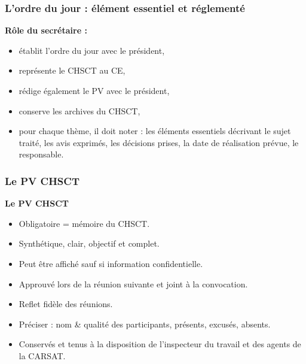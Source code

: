 \documentclass{beamer}
\begin{document}
\begin{frame}
\frametitle{L’ordre du jour : élément essentiel et réglementé}

\textbf{Rôle du secrétaire :}

\begin{itemize}
\item établit l’ordre du jour avec le président,

\item représente le CHSCT au CE,

\item rédige également le PV avec le président,

\item conserve les archives du CHSCT,

\item pour chaque thème, il doit noter : les éléments essentiels décrivant le sujet traité, les avis exprimés, les décisions prises, la date de réalisation prévue, le responsable.
\end{itemize}
\end{frame}

\begin{frame}
\frametitle{Le PV CHSCT}

\textbf{Le PV CHSCT}

\begin{itemize}
\item Obligatoire = mémoire du CHSCT.

\item Synthétique, clair, objectif et complet.

\item Peut être affiché sauf si information confidentielle.

\item Approuvé lors de la réunion suivante et joint à la convocation.

\item Reflet fidèle des réunions.

\item Préciser : nom & qualité des participants, présents, excusés, absents.

\item Conservés et tenus à la disposition de l’inspecteur du travail et des agents de la CARSAT.
\end{itemize}
\end{frame}
\end{document}
